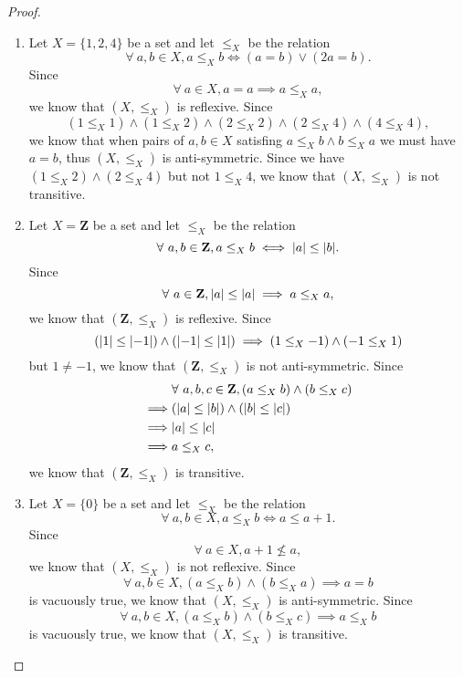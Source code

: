 \begin{proof}
    \begin{enumerate}
        \item Let \(X = \{1, 2, 4\}\) be a set and let \(\leq_X\) be the relation
              \[
                  \forall\ a, b \in X, a \leq_X b \iff (a = b) \lor (2a = b).
              \]
              Since
              \[
                  \forall\ a \in X, a = a \implies a \leq_X a,
              \]
              we know that \((X, \leq_X)\) is reflexive.
              Since
              \[
                  (1 \leq_X 1) \land (1 \leq_X 2) \land (2 \leq_X 2) \land (2 \leq_X 4) \land (4 \leq_X 4),
              \]
              we know that when pairs of \(a, b \in X\) satisfing \(a \leq_X b \land b \leq_X a\) we must have \(a = b\), thus \((X, \leq_X)\) is anti-symmetric.
              Since we have \((1 \leq_X 2) \land (2 \leq_X 4)\) but not \(1 \leq_X 4\), we know that \((X, \leq_X)\) is not transitive.
        \item Let \(X = \mathbf{Z}\) be a set and let \(\leq_X\) be the relation
              \[
                  \forall\ a, b \in \mathbf{Z}, a \leq_X b \iff \abs*{a} \leq \abs*{b}.
              \]
              Since
              \[
                  \forall\ a \in \mathbf{Z}, \abs*{a} \leq \abs*{a} \implies a \leq_X a,
              \]
              we know that \((\mathbf{Z}, \leq_X)\) is reflexive.
              Since
              \[
                  (\abs*{1} \leq \abs*{-1}) \land (\abs*{-1} \leq \abs*{1}) \implies (1 \leq_X -1) \land (-1 \leq_X 1)
              \]
              but \(1 \neq -1\), we know that \((\mathbf{Z}, \leq_X)\) is not anti-symmetric.
              Since
              \begin{align*}
                           & \forall\ a, b, c \in \mathbf{Z}, (a \leq_X b) \land (b \leq_X c) \\
                  \implies & (\abs*{a} \leq \abs*{b}) \land (\abs*{b} \leq \abs*{c})          \\
                  \implies & \abs*{a} \leq \abs*{c}                                           \\
                  \implies & a \leq_X c,
              \end{align*}
              we know that \((\mathbf{Z}, \leq_X)\) is transitive.
        \item Let \(X = \{0\}\) be a set and let \(\leq_X\) be the relation
              \[
                  \forall\ a, b \in X, a \leq_X b \iff a \leq a + 1.
              \]
              Since
              \[
                  \forall\ a \in X, a + 1 \not\leq a,
              \]
              we know that \((X, \leq_X)\) is not reflexive.
              Since
              \[
                  \forall\ a, b \in X, (a \leq_X b) \land (b \leq_X a) \implies a = b
              \]
              is vacuously true, we know that \((X, \leq_X)\) is anti-symmetric.
              Since
              \[
                  \forall\ a, b \in X, (a \leq_X b) \land (b \leq_X c) \implies a \leq_X b
              \]
              is vacuously true, we know that \((X, \leq_X)\) is transitive.
    \end{enumerate}
\end{proof}

